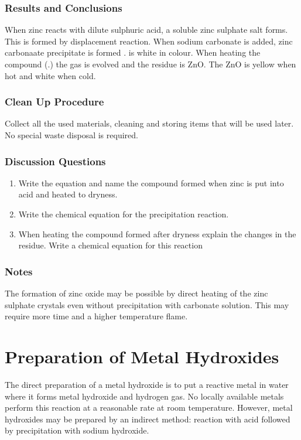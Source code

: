 \subsubsection*{Results and Conclusions}
When zinc reacts with dilute sulphuric acid, a soluble zinc sulphate salt forms. This is formed by displacement reaction. When sodium carbonate is added, zinc carbonaate precipitate is formed .  is white in colour. When heating the compound (.) the gas  is evolved and the residue is ZnO. The ZnO is yellow when hot and white when cold.

\subsubsection*{Clean Up Procedure}
Collect all the used materials, cleaning and storing items that will be used later. No special waste disposal is required.

\subsubsection*{Discussion Questions}
\begin{enumerate}
\item{Write the equation and name the compound formed when zinc is put into acid and heated to dryness.}
\item{Write the chemical equation for the precipitation reaction.}
\item{When heating the compound formed after dryness explain the changes in the residue. Write a chemical equation for this reaction}
\end{enumerate}
\subsubsection*{Notes}
The formation of zinc oxide may be possible by direct heating of the zinc sulphate crystals even without precipitation with carbonate solution. This may require more time and a higher temperature flame.

\section{Preparation of Metal Hydroxides}

The direct preparation of a metal hydroxide is to put a reactive metal in water where it forms metal hydroxide and hydrogen gas. No locally available metals perform this reaction at a reasonable rate at room temperature. However, metal hydroxides may be prepared by an indirect method: reaction with acid followed by precipitation with sodium hydroxide.

